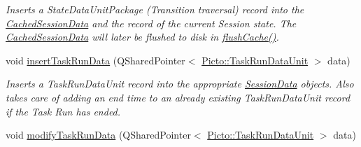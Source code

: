 \begin{DoxyCompactItemize}
\begin{DoxyCompactList}\small\item\em Inserts a State\-Data\-Unit\-Package (Transition traversal) record into the \hyperlink{class_cached_session_data}{Cached\-Session\-Data} and the record of the current Session state. The \hyperlink{class_cached_session_data}{Cached\-Session\-Data} will later be flushed to disk in \hyperlink{class_session_info_af4106254bbe6282aae6e79e3b92ece2b}{flush\-Cache()}. \end{DoxyCompactList}\item 
\hypertarget{class_session_info_a5a8b4530a8514000bf7d911a687e8416}{void \hyperlink{class_session_info_a5a8b4530a8514000bf7d911a687e8416}{insert\-Task\-Run\-Data} (Q\-Shared\-Pointer$<$ \hyperlink{class_picto_1_1_task_run_data_unit}{Picto\-::\-Task\-Run\-Data\-Unit} $>$ data)}\label{class_session_info_a5a8b4530a8514000bf7d911a687e8416}

\begin{DoxyCompactList}\small\item\em Inserts a Task\-Run\-Data\-Unit record into the appropriate \hyperlink{class_session_data}{Session\-Data} objects. Also takes care of adding an end time to an already existing Task\-Run\-Data\-Unit record if the Task Run has ended. \end{DoxyCompactList}\item 
\hypertarget{class_session_info_adb462c89e0224fdf982d4f2502501bc5}{void \hyperlink{class_session_info_adb462c89e0224fdf982d4f2502501bc5}{modify\-Task\-Run\-Data} (Q\-Shared\-Pointer$<$ \hyperlink{class_picto_1_1_task_run_data_unit}{Picto\-::\-Task\-Run\-Data\-Unit} $>$ data)}\label{class_session_info_adb462c89e0224fdf982d4f2502501bc5}


\end{DoxyCompactItemize}
